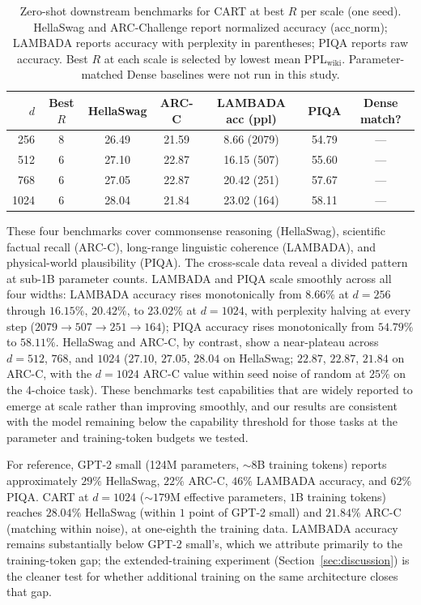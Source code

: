 \documentclass{article}
\newcommand{\cart}{\textsc{CART}}
\newcommand{\pplwiki}{PPL$_\text{wiki}$}
\begin{document}
\begin{table}[htbp]
\centering
\caption{Zero-shot downstream benchmarks for \cart{} at best $R$ per scale (one seed). HellaSwag and ARC-Challenge report normalized accuracy ($\mathrm{acc\_norm}$); LAMBADA reports accuracy with perplexity in parentheses; PIQA reports raw accuracy. Best $R$ at each scale is selected by lowest mean \pplwiki{}. Parameter-matched Dense baselines were not run in this study.}
\label{tab:benchmarks}
\footnotesize
\begin{tabular}{rcccccc}
\toprule
$d$ & Best $R$ & HellaSwag & ARC-C & LAMBADA acc (ppl) & PIQA & Dense match? \\
\midrule
 256 &  8 & 26.49 & 21.59 & 8.66 (2079) & 54.79 & --- \\
 512 &  6 & 27.10 & 22.87 & 16.15 (507) & 55.60 & --- \\
 768 &  6 & 27.05 & 22.87 & 20.42 (251) & 57.67 & --- \\
1024 &  6 & 28.04 & 21.84 & 23.02 (164) & 58.11 & --- \\
\bottomrule
\end{tabular}
\end{table}

These four benchmarks cover commonsense reasoning (HellaSwag), scientific factual recall (ARC-C), long-range linguistic coherence (LAMBADA), and physical-world plausibility (PIQA). The cross-scale data reveal a divided pattern at sub-1B parameter counts. LAMBADA and PIQA scale smoothly across all four widths: LAMBADA accuracy rises monotonically from $8.66\%$ at $d{=}256$ through $16.15\%$, $20.42\%$, to $23.02\%$ at $d{=}1024$, with perplexity halving at every step ($2079 \to 507 \to 251 \to 164$); PIQA accuracy rises monotonically from $54.79\%$ to $58.11\%$. HellaSwag and ARC-C, by contrast, show a near-plateau across $d{=}512$, $768$, and $1024$ ($27.10$, $27.05$, $28.04$ on HellaSwag; $22.87$, $22.87$, $21.84$ on ARC-C, with the $d{=}1024$ ARC-C value within seed noise of random at $25\%$ on the 4-choice task). These benchmarks test capabilities that are widely reported to emerge at scale rather than improving smoothly, and our results are consistent with the model remaining below the capability threshold for those tasks at the parameter and training-token budgets we tested.

For reference, GPT-2 small (124M parameters, $\sim 8$B training tokens) reports approximately $29\%$ HellaSwag, $22\%$ ARC-C, $46\%$ LAMBADA accuracy, and $62\%$ PIQA. CART at $d{=}1024$ ($\sim 179$M effective parameters, $1$B training tokens) reaches $28.04\%$ HellaSwag (within $1$ point of GPT-2 small) and $21.84\%$ ARC-C (matching within noise), at one-eighth the training data. LAMBADA accuracy remains substantially below GPT-2 small's, which we attribute primarily to the training-token gap; the extended-training experiment (Section~\ref{sec:discussion}) is the cleaner test for whether additional training on the same architecture closes that gap.
\end{document}
